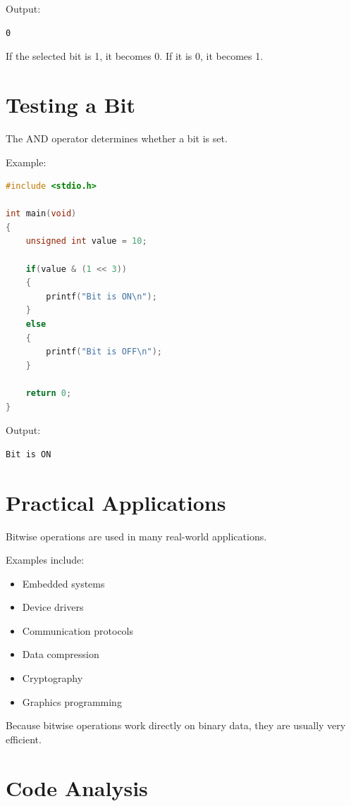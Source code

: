 \documentclass[12pt,openany]{book}
\begin{document}
Output:

\begin{lstlisting}
0
\end{lstlisting}

If the selected bit is 1, it becomes 0. If it is 0, it becomes 1.

\section{Testing a Bit}

The AND operator determines whether a bit is set.

Example:

\begin{lstlisting}[language=C]
#include <stdio.h>

int main(void)
{
    unsigned int value = 10;

    if(value & (1 << 3))
    {
        printf("Bit is ON\n");
    }
    else
    {
        printf("Bit is OFF\n");
    }

    return 0;
}
\end{lstlisting}

Output:

\begin{lstlisting}
Bit is ON
\end{lstlisting}
\section{Practical Applications}

Bitwise operations are used in many real-world applications.

Examples include:

\begin{itemize}
    \item Embedded systems
    \item Device drivers
    \item Communication protocols
    \item Data compression
    \item Cryptography
    \item Graphics programming
\end{itemize}

Because bitwise operations work directly on binary data, they are usually very efficient.

\section{Code Analysis}
\end{document}
